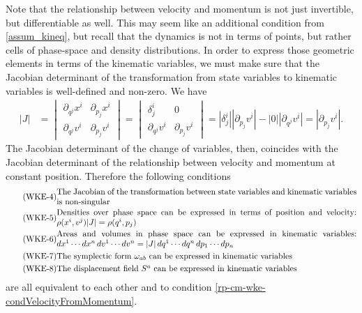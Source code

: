 Note that the relationship between velocity and momentum is not just invertible, but differentiable as well. This may seem like an additional condition from \ref{assum_kineq}, but recall that the dynamics is not in terms of points, but rather cells of phase-space and density distributions. In order to express those geometric elements in terms of the kinematic variables, we must make sure that the Jacobian determinant of the transformation from state variables to kinematic variables is well-defined and non-zero. We have
\begin{equation}\label{rp-cm-lm-JacobianMomentumVelocity}
	\begin{aligned}
		|J| &= \begin{vmatrix}
			\partial_{q^j} x^i & \partial_{p_j} x^i  \\
			\partial_{q^j} v^i & \partial_{p_j} v^i
		\end{vmatrix}
		= \begin{vmatrix}
			\delta^i_j & 0 \\
			\partial_{q^j} v^i & \partial_{p_j} v^i
		\end{vmatrix} 
		= \left|\delta^i_j\right| \left|\partial_{p_j} v^i\right| - |0| \left|\partial_{q^j} v^i\right| = \left|\partial_{p_j} v^i\right|.
	\end{aligned}
\end{equation}
The Jacobian determinant of the change of variables, then, coincides with the Jacobian determinant of the relationship between velocity and momentum at constant position. Therefore the following conditions
\begin{align}
	\tag{WKE-4}\label{rp-cm-wke-condJacobianNonSingular}
	&\parbox{5in}{The Jacobian of the transformation between state variables and kinematic variables is non-singular} \\
	\tag{WKE-5}\label{rp-cm-wke-condDensities}
	&\parbox{5in}{Densities over phase space can be expressed in terms of position and velocity: $\rho(x^i, v^j) |J| = \rho(q^i, p_j)$} \\
	\tag{WKE-6}\label{rp-cm-wke-condAreas}
	&\parbox{5in}{Areas and volumes in phase space can be expressed in kinematic variables: $dx^1 \cdots dx^n \, dv^1 \cdots dv^n = |J| \, dq^1 \cdots dq^n \, dp_1 \cdots dp_n$} \\
	\tag{WKE-7}\label{rp-cm-wke-condSymplectic}
	&\parbox{5in}{The symplectic form $\omega_{ab}$ can be expressed in kinematic variables} \\
	\tag{WKE-8}\label{rp-cm-wke-condDisplacement}
	&\parbox{5in}{The displacement field $S^a$ can be expressed in kinematic variables}
\end{align}
are all equivalent to each other and to condition \ref{rp-cm-wke-condVelocityFromMomentum}.

